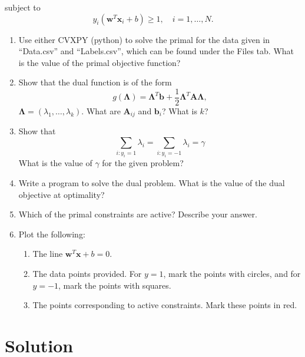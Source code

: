 \documentclass[12pt,a4paper]{article}
\theoremstyle{remark}
\begin{document}
subject to $$y_i(\mathbf{w}^T \mathbf{x}_i + b) \geq 1, \quad i = 1, \ldots, N.$$

\begin{enumerate}
    \item Use either CVXPY (python) to solve the primal for the data given in \enquote{Data.csv} and \enquote{Labels.csv}, which can be found under the Files tab. What is the value of the primal objective function?
    \item Show that the dual function is of the form $$g(\mathbf{\Lambda}) = \mathbf{\Lambda}^T \mathbf{b} + \frac{1}{2} \mathbf{\Lambda}^T \mathbf{A} \mathbf{\Lambda},$$ $\mathbf{\Lambda} = (\lambda_1, \ldots, \lambda_k)$. What are $\mathbf{A}_{ij}$ and $\mathbf{b}_i$? What is $k$?
    \item Show that
    \[
        \sum_{i: y_i = 1} \lambda_i = \sum_{i: y_i = -1} \lambda_i = \gamma
    \]
    What is the value of $\gamma$ for the given problem?
    \item Write a program to solve the dual problem. What is the value of the dual objective at optimality?
    \item Which of the primal constraints are active? Describe your answer.
    \item Plot the following:
    \begin{enumerate}
        \item The line $\mathbf{w}^T \mathbf{x} + b = 0$.
        \item The data points provided. For $y = 1$, mark the points with circles, and for $y = -1$, mark the points with squares.
        \item The points corresponding to active constraints. Mark these points in red.
    \end{enumerate}
\end{enumerate}


\section*{Solution}
\end{document}

